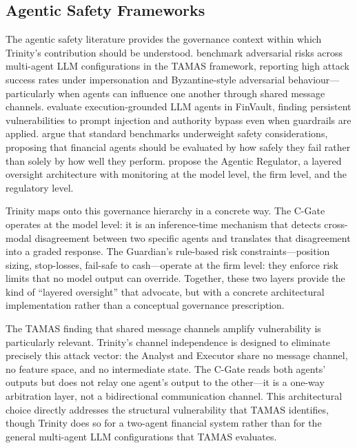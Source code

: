 \subsection{Agentic Safety Frameworks}
\label{sec:disc-agentic-safety}

The agentic safety literature provides the governance context within which
Trinity's contribution should be understood. \cite{kavathekar2025tamas}
benchmark adversarial risks across multi-agent LLM configurations in the
TAMAS framework, reporting high attack success rates under impersonation and
Byzantine-style adversarial behaviour---particularly when agents can influence
one another through shared message channels. \cite{yang_finvault_2026} evaluate
execution-grounded LLM agents in FinVault, finding persistent vulnerabilities
to prompt injection and authority bypass even when guardrails are applied.
\cite{chen_standard_2025} argue that standard benchmarks underweight safety
considerations, proposing that financial agents should be evaluated by how
safely they fail rather than solely by how well they perform.
\cite{kurshan_agentic_2025} propose the Agentic Regulator, a layered
oversight architecture with monitoring at the model level, the firm level, and
the regulatory level.

Trinity maps onto this governance hierarchy in a concrete way. The C-Gate
operates at the model level: it is an inference-time mechanism that detects
cross-modal disagreement between two specific agents and translates that
disagreement into a graded response. The Guardian's rule-based risk
constraints---position sizing, stop-losses, fail-safe to cash---operate at
the firm level: they enforce risk limits that no model output can override.
Together, these two layers provide the kind of ``layered oversight'' that
\cite{kurshan_agentic_2025} advocate, but with a concrete architectural
implementation rather than a conceptual governance prescription.

The TAMAS finding that shared message channels amplify vulnerability is
particularly relevant. Trinity's channel independence is designed to
eliminate precisely this attack vector: the Analyst and Executor share no
message channel, no feature space, and no intermediate state. The C-Gate
reads both agents' outputs but does not relay one agent's output to the
other---it is a one-way arbitration layer, not a bidirectional communication
channel. This architectural choice directly addresses the structural
vulnerability that TAMAS identifies, though Trinity does so for a two-agent
financial system rather than for the general multi-agent LLM configurations
that TAMAS evaluates.

